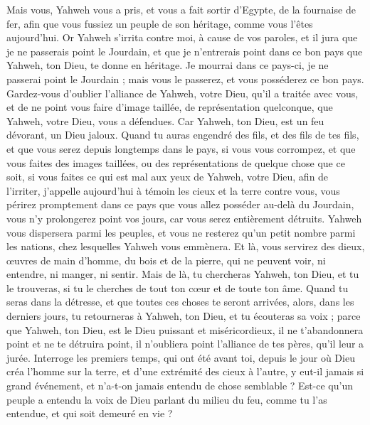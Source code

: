 \begin{multicols}{2}
Mais vous, Yahweh vous a pris, et vous a fait sortir d'Egypte, de la fournaise de fer, afin que vous fussiez un peuple de son héritage, comme vous l'êtes aujourd'hui.
Or Yahweh s'irrita contre moi, à cause de vos paroles, et il jura que je ne passerais point le Jourdain, et que je n'entrerais point dans ce bon pays que Yahweh, ton Dieu, te donne en héritage.
Je mourrai dans ce pays-ci, je ne passerai point le Jourdain ; mais vous le passerez, et vous posséderez ce bon pays.
Gardez-vous d'oublier l'alliance de Yahweh, votre Dieu, qu'il a traitée avec vous, et de ne point vous faire d'image taillée, de représentation quelconque, que Yahweh, votre Dieu, vous a défendues.
Car Yahweh, ton Dieu, est un feu dévorant, un Dieu jaloux.
Quand tu auras engendré des fils, et des fils de tes fils, et que vous serez depuis longtemps dans le pays, si vous vous corrompez, et que vous faites des images taillées, ou des représentations de quelque chose que ce soit, si vous faites ce qui est mal aux yeux de Yahweh, votre Dieu, afin de l'irriter,
j'appelle aujourd'hui à témoin les cieux et la terre contre vous, vous périrez promptement dans ce pays que vous allez posséder au-delà du Jourdain, vous n'y prolongerez point vos jours, car vous serez entièrement détruits.
Yahweh vous dispersera parmi les peuples, et vous ne resterez qu'un petit nombre parmi les nations, chez lesquelles Yahweh vous emmènera.
Et là, vous servirez des dieux, œuvres de main d'homme, du bois et de la pierre, qui ne peuvent voir, ni entendre, ni manger, ni sentir.
Mais de là, tu chercheras Yahweh, ton Dieu, et tu le trouveras, si tu le cherches de tout ton cœur et de toute ton âme.
Quand tu seras dans la détresse, et que toutes ces choses te seront arrivées, alors, dans les derniers jours, tu retourneras à Yahweh, ton Dieu, et tu écouteras sa voix ;
parce que Yahweh, ton Dieu, est le Dieu puissant et miséricordieux, il ne t'abandonnera point et ne te détruira point, il n'oubliera point l'alliance de tes pères, qu'il leur a jurée.
Interroge les premiers temps, qui ont été avant toi, depuis le jour où Dieu créa l'homme sur la terre, et d'une extrémité des cieux à l'autre, y eut-il jamais si grand événement, et n'a-t-on jamais entendu de chose semblable ?
Est-ce qu'un peuple a entendu la voix de Dieu parlant du milieu du feu, comme tu l'as entendue, et qui soit demeuré en vie ?

\end{multicols}
